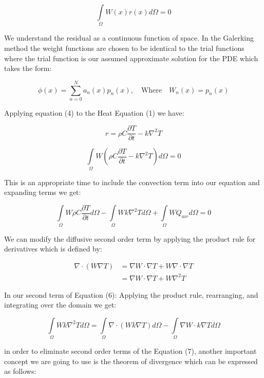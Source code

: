\documentclass[12pt]{article}
\begin{document}
	\begin{equation}
		\int\limits_{\Omega} W(x) r(x) d\Omega = 0
	\end{equation}
	
	We understand the residual as a continuous function of space.  In the Galerking method the weight functions are chosen to be identical to the trial functions where the trial function is our assumed approximate solution for the PDE which takes the form:
	
	

	\begin{equation}
		\phi(x) = \sum_{n=0}^N a_n(x)p_n(x), \quad \text{Where}  \quad W_n(x)=p_n(x)
	\end{equation}		
	
	Applying equation (4) to the Heat Equation (1) we have:

$$
r={\rho C \frac{\partial T}{\partial t} - k \nabla^2 T}
$$

	$$\int\limits_{\Omega} W ({\rho C \frac{\partial T}{\partial t} - k \nabla^2 T}) d\Omega = 0$$
	
	This is an appropriate time to include the convection term into our equation and expanding terms we get:
	
	\begin{equation}
		\int\limits_{\Omega} W \rho C \frac{\partial T}{\partial t} d\Omega - \int\limits_{\Omega} W k \nabla^2 T d\Omega + \int\limits_{\Omega} W Q_{air} d\Omega = 0
	\end{equation}

	We can modify the diffusive second order term by applying the product rule for derivatives which is defined by:
	
\begin{align*}
\nabla\cdot(W\nabla T) &= \nabla W \cdot\nabla T+W \nabla \cdot\nabla T \\
&=\nabla W \cdot\nabla T+W \nabla^2 T
\end{align*}

In our second term of Equation (6): Applying the product rule, rearranging, and integrating over the domain we get:
		
	\begin{equation}
	\int\limits_{\Omega} W k \nabla^2 T d\Omega = \int\limits_{\Omega} \nabla \cdot ({Wk\nabla T}) d\Omega - \int\limits_{\Omega} \nabla W \cdot k \nabla T d\Omega
	\end{equation}

	in order to eliminate second order terms of the Equation (7), another important concept we are going to use is the theorem of divergence which can be expressed as follows:
	
\end{document}
